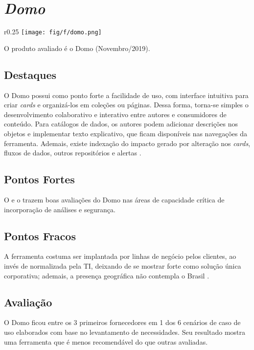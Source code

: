 \section{\emph{Domo}}
\label{sub-domo}

\begin{wrapfigure}[6]{r}{0.25\textwidth}     
    \centering
    \texttt{[image: fig/f/domo.png]}
\end{wrapfigure}

O produto avaliado é o Domo (Novembro/2019).

\subsection*{Destaques}

O Domo possui como ponto forte a facilidade de uso, com interface intuitiva para criar \emph{cards} e organizá-los em coleções ou páginas. Dessa forma, torna-se simples o desenvolvimento colaborativo e interativo entre autores e consumidores de conteúdo. Para catálogos de dados, os autores podem adicionar descrições nos objetos e implementar texto explicativo, que ficam disponíveis nas navegações da ferramenta. Ademais, existe indexação do impacto gerado por alteração nos \emph{cards}, fluxos de dados, outros repositórios e alertas \cite{gartner:criticalcapabilities}.

\subsection*{Pontos Fortes}

O \relGMQ \xspace e o \relGCC \xspace trazem boas avaliações do Domo nas áreas de capacidade crítica de incorporação de análises e segurança.

\subsection*{Pontos Fracos}

A ferramenta costuma ser implantada por linhas de negócio pelos clientes, ao invés de normalizada pela TI, deixando de se mostrar forte como solução única corporativa; ademais, a presença geográfica não contempla o Brasil \cite{gartner:magicquadrant}.

\subsection*{Avaliação}

O Domo ficou entre os 3 primeiros fornecedores em 1 dos 6 cenários de caso de uso elaborados com base no levantamento de necessidades. Seu resultado mostra uma ferramenta que é menos recomendável do que outras avaliadas.

